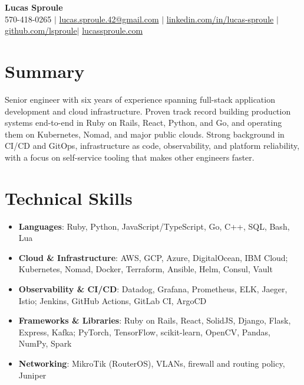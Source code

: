 \documentclass[letterpaper,10pt]{article}
\newcommand{\resumeItem}[1]{\item\small{#1}}
\newcommand{\resumeSubHeadingList}{\begin{itemize}[leftmargin=0.15in, label={}]}
\newcommand{\resumeSubHeadingListEnd}{\end{itemize}}
\begin{document}
\begin{center}
  \textbf{\Huge Lucas Sproule} \\
  \small 570-418-0265 $|$ \href{mailto:lucas.sproule.42@gmail.com}{lucas.sproule.42@gmail.com} $|$ 
  \href{https://linkedin.com/in/lucas-sproule}{linkedin.com/in/lucas-sproule} $|$
  \href{https://github.com/lsproule}{github.com/lsproule}$|$
  \href{https://lucassproule.com}{lucassproule.com}
\end{center}

\section*{Summary}
Senior engineer with six years of experience spanning full-stack application development and cloud infrastructure. Proven track record building production systems end-to-end in Ruby on Rails, React, Python, and Go, and operating them on Kubernetes, Nomad, and major public clouds. Strong background in CI/CD and GitOps, infrastructure as code, observability, and platform reliability, with a focus on self-service tooling that makes other engineers faster.

\section{Technical Skills}
\resumeSubHeadingList
  \resumeItem{\textbf{Languages}: Ruby, Python, JavaScript/TypeScript, Go, C++, SQL, Bash, Lua}
  \resumeItem{\textbf{Cloud \& Infrastructure}: AWS, GCP, Azure, DigitalOcean, IBM Cloud; Kubernetes, Nomad, Docker, Terraform, Ansible, Helm, Consul, Vault}
  \resumeItem{\textbf{Observability \& CI/CD}: Datadog, Grafana, Prometheus, ELK, Jaeger, Istio; Jenkins, GitHub Actions, GitLab CI, ArgoCD}
  \resumeItem{\textbf{Frameworks \& Libraries}: Ruby on Rails, React, SolidJS, Django, Flask, Express, Kafka; PyTorch, TensorFlow, scikit-learn, OpenCV, Pandas, NumPy, Spark}
  \resumeItem{\textbf{Networking}: MikroTik (RouterOS), VLANs, firewall and routing policy, Juniper}
\resumeSubHeadingListEnd
\end{document}
